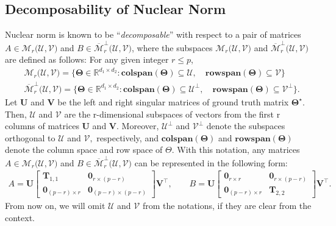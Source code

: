 \documentclass[12pt]{article}
\begin{document}
\subsection{Decomposability of Nuclear Norm} \label{Decomp}
Nuclear norm is known to be ``\textit{decomposable}'' with respect to a pair of matrices $A\in\mathcal{M}_{r}\big( \mathcal{U}, \mathcal{V} \big)$ and $B\in\overline{\mathcal{M}}_{r}^{\perp}\big( \mathcal{U}, \mathcal{V} \big)$, where the subspaces $\mathcal{M}_{r}\big( \mathcal{U}, \mathcal{V} \big)$ and $\overline{\mathcal{M}}_{r}^{\perp}\big( \mathcal{U}, \mathcal{V} \big)$ are defined as follows:
For any given integer $r\leq p$, 
\begin{align}
    &\mathcal{M}_{r}\big( \mathcal{U}, \mathcal{V} \big) = \big\{ \boldsymbol{\Theta}\in\mathbb{R}^{d_{1} \times d_{2}} : \textbf{colspan}(\boldsymbol{\Theta}) \subseteq \mathcal{U},\quad  \textbf{rowspan}(\boldsymbol{\Theta}) \subseteq \mathcal{V}  \big\} \label{M} \\
    &\overline{\mathcal{M}}_{r}^{\perp}\big( \mathcal{U}, \mathcal{V} \big) = \big\{ \boldsymbol{\Theta}\in\mathbb{R}^{d_{1} \times d_{2}} : \textbf{colspan}(\boldsymbol{\Theta}) \subseteq \mathcal{U}^{\perp},\quad  \textbf{rowspan}(\boldsymbol{\Theta}) \subseteq \mathcal{V}^{\perp} \big\}.
    \label{M_perp}
\end{align}
Let $\boldsymbol{U}$ and $\boldsymbol{V}$ be the left and right singular matrices of ground truth matrix $\boldsymbol{\Theta^{\star}}$.
Then, $\mathcal{U}$ and $\mathcal{V}$ are the r-dimensional subspaces of vectors from the first r columns of matrices $\boldsymbol{U}$ and $\boldsymbol{V}$. 
Moreover, $\mathcal{U}^{\perp}$ and $\mathcal{V}^{\perp}$ denote the subspaces orthogonal to  $\mathcal{U}$ and $\mathcal{V},$ respectively, and $\textbf{colspan}(\boldsymbol{\Theta})$ and $\textbf{rowspan}(\boldsymbol{\Theta})$ denote the column space and row space of $\Theta$.
With this notation, any matrices $A\in\mathcal{M}_{r}\big( \mathcal{U}, \mathcal{V} \big)$ and $B\in\overline{\mathcal{M}}_{r}^{\perp}\big( \mathcal{U}, \mathcal{V} \big)$ can be represented in the following form:
\begin{align*}
    A = \boldsymbol{U}
    \begin{bmatrix}
        \boldsymbol{T}_{1,1} & \boldsymbol{0}_{r\times (p-r)} \\
        \boldsymbol{0}_{(p-r) \times r} & \boldsymbol{0}_{(p-r) \times (p-r)} 
    \end{bmatrix}
    \boldsymbol{V}^{\top}, \qquad
    B = \boldsymbol{U}
    \begin{bmatrix}
        \boldsymbol{0}_{r \times r} & \boldsymbol{0}_{r\times (p-r)} \\
        \boldsymbol{0}_{(p-r) \times r} & \boldsymbol{T}_{2,2}
    \end{bmatrix}
    \boldsymbol{V}^{\top}.
\end{align*}
From now on, we will omit $\mathcal{U}$ and $\mathcal{V}$ from the notations, if they are clear from the context. 
\end{document}
